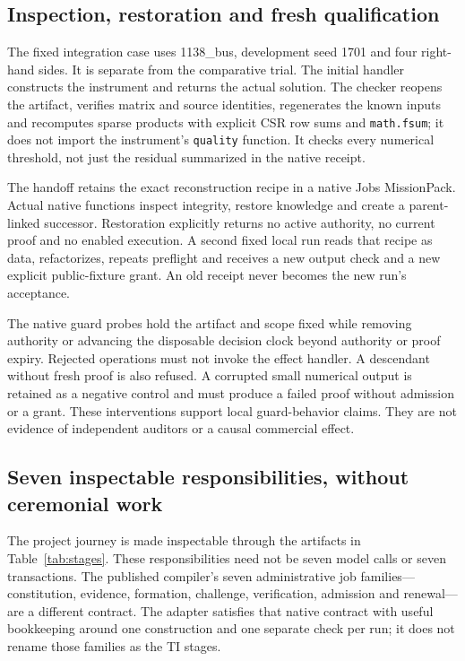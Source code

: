 \documentclass[11pt,a4paper]{article}
\begin{document}
\subsection{Inspection, restoration and fresh qualification}
The fixed integration case uses 1138\_bus, development seed 1701 and four right-hand sides. It is separate from the comparative trial. The initial handler constructs the instrument and returns the actual solution. The checker reopens the artifact, verifies matrix and source identities, regenerates the known inputs and recomputes sparse products with explicit CSR row sums and \texttt{math.fsum}; it does not import the instrument's \texttt{quality} function. It checks every numerical threshold, not just the residual summarized in the native receipt.

The handoff retains the exact reconstruction recipe in a native Jobs MissionPack. Actual native functions inspect integrity, restore knowledge and create a parent-linked successor. Restoration explicitly returns no active authority, no current proof and no enabled execution. A second fixed local run reads that recipe as data, refactorizes, repeats preflight and receives a new output check and a new explicit public-fixture grant. An old receipt never becomes the new run's acceptance.

The native guard probes hold the artifact and scope fixed while removing authority or advancing the disposable decision clock beyond authority or proof expiry. Rejected operations must not invoke the effect handler. A descendant without fresh proof is also refused. A corrupted small numerical output is retained as a negative control and must produce a failed proof without admission or a grant. These interventions support local guard-behavior claims. They are not evidence of independent auditors or a causal commercial effect.

\subsection{Seven inspectable responsibilities, without ceremonial work}
The project journey is made inspectable through the artifacts in Table~\ref{tab:stages}. These responsibilities need not be seven model calls or seven transactions. The published compiler's seven administrative job families---constitution, evidence, formation, challenge, verification, admission and renewal---are a different contract. The adapter satisfies that native contract with useful bookkeeping around one construction and one separate check per run; it does not rename those families as the TI stages.
\end{document}
